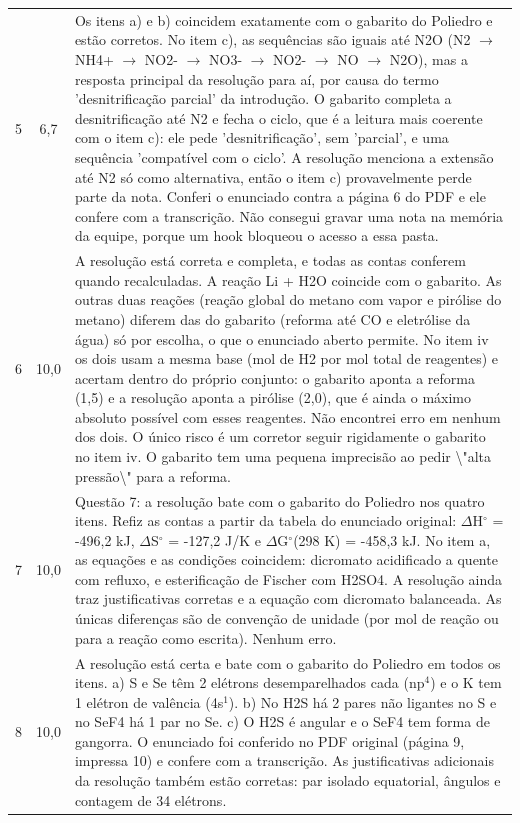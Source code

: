 \documentclass{article}%
\begin{document}
\begin{longtable}{@{}c c p{}@{}}
5 & 6,7 & Os itens a) e b) coincidem exatamente com o gabarito do Poliedro e estão corretos. No item c), as sequências são iguais até N2O (N2 $\to$ NH4+ $\to$ NO2- $\to$ NO3- $\to$ NO2- $\to$ NO $\to$ N2O), mas a resposta principal da resolução para aí, por causa do termo 'desnitrificação parcial' da introdução. O gabarito completa a desnitrificação até N2 e fecha o ciclo, que é a leitura mais coerente com o item c): ele pede 'desnitrificação', sem 'parcial', e uma sequência 'compatível com o ciclo'. A resolução menciona a extensão até N2 só como alternativa, então o item c) provavelmente perde parte da nota. Conferi o enunciado contra a página 6 do PDF e ele confere com a transcrição. Não consegui gravar uma nota na memória da equipe, porque um hook bloqueou o acesso a essa pasta. \\
6 & 10,0 & A resolução está correta e completa, e todas as contas conferem quando recalculadas. A reação Li + H2O coincide com o gabarito. As outras duas reações (reação global do metano com vapor e pirólise do metano) diferem das do gabarito (reforma até CO e eletrólise da água) só por escolha, o que o enunciado aberto permite. No item iv os dois usam a mesma base (mol de H2 por mol total de reagentes) e acertam dentro do próprio conjunto: o gabarito aponta a reforma (1,5) e a resolução aponta a pirólise (2,0), que é ainda o máximo absoluto possível com esses reagentes. Não encontrei erro em nenhum dos dois. O único risco é um corretor seguir rigidamente o gabarito no item iv. O gabarito tem uma pequena imprecisão ao pedir \textbackslash{}"alta pressão\textbackslash{}" para a reforma. \\
7 & 10,0 & Questão 7: a resolução bate com o gabarito do Poliedro nos quatro itens. Refiz as contas a partir da tabela do enunciado original: $\Delta$H$^\circ$ = -496,2 kJ, $\Delta$S$^\circ$ = -127,2 J/K e $\Delta$G$^\circ$(298 K) = -458,3 kJ. No item a, as equações e as condições coincidem: dicromato acidificado a quente com refluxo, e esterificação de Fischer com H2SO4. A resolução ainda traz justificativas corretas e a equação com dicromato balanceada. As únicas diferenças são de convenção de unidade (por mol de reação ou para a reação como escrita). Nenhum erro. \\
8 & 10,0 & A resolução está certa e bate com o gabarito do Poliedro em todos os itens. a) S e Se têm 2 elétrons desemparelhados cada (np$^{4}$) e o K tem 1 elétron de valência (4s$^{1}$). b) No H2S há 2 pares não ligantes no S e no SeF4 há 1 par no Se. c) O H2S é angular e o SeF4 tem forma de gangorra. O enunciado foi conferido no PDF original (página 9, impressa 10) e confere com a transcrição. As justificativas adicionais da resolução também estão corretas: par isolado equatorial, ângulos e contagem de 34 elétrons. \\

\end{longtable}
\end{document}
